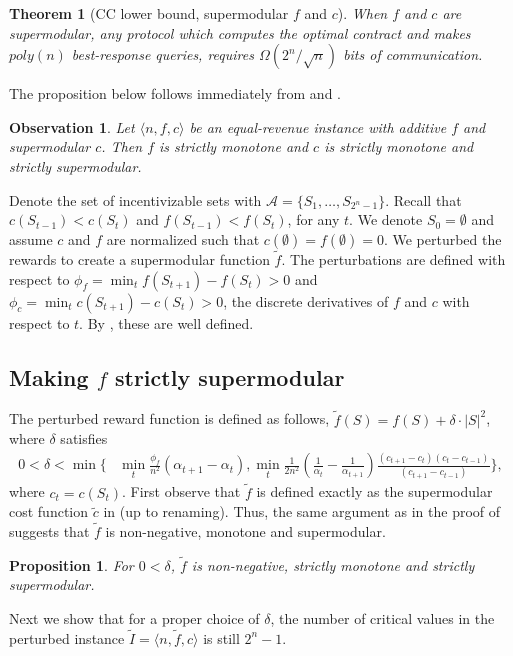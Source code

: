 \documentclass[11pt]{article}
\newtheorem{theorem}{Theorem}
\newtheorem{observation}{Observation}
\newtheorem{proposition}{Proposition}
\newcommand{\IS}{\mathcal{A}}
\newcommand{\inst}[3]{\langle #1, #2, #3 \rangle}
\newcommand{\tc}{\tilde{c}}
\newcommand{\tf}{\tilde{f}}
\newcommand{\tI}{\tilde{I}}
\newcommand{\InstFTildeI}{\tI = \inst{n}{\tf}{c}}
\begin{document}
\begin{theorem}[CC lower bound, supermodular $f$ and $c$]\label{thm:cc_supmod_f_c}
    When $f$ and $c$ are supermodular, any protocol which computes the optimal contract and makes $poly(n)$ best-response queries, requires $\Omega(2^n/\sqrt{n})$ bits of communication.
\end{theorem}

The proposition below follows immediately from  and .
\begin{observation}\label{obs:equalrev_addf_prop}
Let $\inst{n}{f}{c}$ be an equal-revenue instance with additive $f$ and supermodular $c$. Then $f$ is strictly monotone and $c$ is strictly monotone and strictly supermodular.
\end{observation}
    
Denote the set of incentivizable sets with $\IS = \{S_1,\dots,S_{2^n-1}\}$. Recall that $c(S_{t-1})<c(S_t)$ and $f(S_{t-1})<f(S_t)$, for any $t$.
We denote $S_0 = \emptyset$ and assume $c$ and $f$ are normalized such that $c(\emptyset)=f(\emptyset)=0$.
We perturbed the rewards to create a supermodular function $\tf$. The perturbations are defined with respect to 
$\phi_f = \min_{t} f(S_{t+1})-f(S_{t}) > 0$ and
$\phi_c = \min_{t} c(S_{t+1})-c(S_{t}) > 0$, the discrete derivatives of $f$ and $c$ with respect to $t$. By , these are well defined.

\subsection{Making $f$ strictly supermodular}
The perturbed reward function is defined as follows, $\tf(S)=f(S) + \delta \cdot |S|^2$, where $\delta$ satisfies
\begin{align}\label{eq:eps_for_tf}
0 < 
\delta < \min \Bigg\{ 
& \min_t \frac{\phi_f}{n^2}(\alpha_{t+1}-\alpha_t), 
\min_t \frac{1}{2n^2}\left(\frac{1}{\alpha_t}-\frac{1}{\alpha_{t+1}}\right)\frac{(c_{t+1}-c_{t})(c_{t}-c_{t-1})}{(c_{t+1}-c_{t-1})}
 \bigg\},
\end{align}
where $c_t = c(S_t)$.
First observe that $\tf$ is defined exactly as the supermodular cost function $\tc$ in  (up to renaming). Thus, the same argument as in the proof of  suggests that $\tf$ is non-negative, monotone and supermodular.
    
\begin{proposition}\label{prop:tf_basic_props}
For $0 < \delta$, $\tf$ is non-negative, strictly monotone and strictly supermodular.
\end{proposition}
Next we show that for a proper choice of $\delta$, the number of critical values in the perturbed instance $\InstFTildeI$ is still $2^n-1$.
\end{document}
